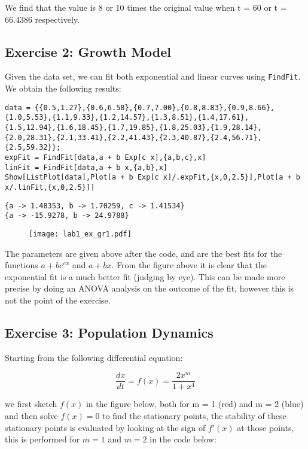 \documentclass[11pt,a4paper,onecolumn]{article}
\begin{document}
We find that the value is 8 or 10 times the original value when t = 60 or t = 66.4386 respectively.

\subsection{Exercise 2: Growth Model}

Given the data set, we can fit both exponential and linear curves using \texttt{FindFit}. We obtain the following results:

\begin{lstlisting}[mathescape]
data = {{0.5,1.27},{0.6,6.58},{0.7,7.00},{0.8,8.83},{0.9,8.66},
{1.0,5.53},{1.1,9.33},{1.2,14.57},{1.3,8.51},{1.4,17.61},
{1.5,12.94},{1.6,18.45},{1.7,19.85},{1.8,25.03},{1.9,28.14},
{2.0,28.31},{2.1,33.41},{2.2,41.43},{2.3,40.87},{2.4,56.71},
{2.5,59.32}};
expFit = FindFit[data,a + b Exp[c x],{a,b,c},x]
linFit = FindFit[data,a + b x,{a,b},x]
Show[ListPlot[data],Plot[a + b Exp[c x]/.expFit,{x,0,2.5}],Plot[a + b x/.linFit,{x,0,2.5}]]
\end{lstlisting}
\begin{lstlisting}[mathescape]
{a -> 1.48353, b -> 1.70259, c -> 1.41534}
{a -> -15.9278, b -> 24.9788}
\end{lstlisting}

\begin{figure}[H]
  \centering
  \texttt{[image: lab1\_ex\_gr1.pdf]}
\end{figure}

The parameters are given above after the code, and are the best fits for the functions $a + be^{cx}$ and $a + bx$. From the figure above it is clear that the exponential fit is a much better fit (judging by eye). This can be made more precise by doing an ANOVA analysis on the outcome of the fit, however this is not the point of the exercise.

\subsection{Exercise 3: Population Dynamics}

Starting from the following differential equation:

\begin{equation*}
  \frac{dx}{dt} = f(x) = \frac{2 x^m}{1 + x^4}
\end{equation*}

we first sketch $f(x)$ in the figure below, both for m = 1 (red) and m = 2 (blue) and then solve $f(x) = 0$ to find the stationary points, the stability of these stationary points is evaluated by looking at the sign of $f'(x)$ at those points, this is performed for $m = 1$ and $m = 2$ in the code below:
\end{document}
